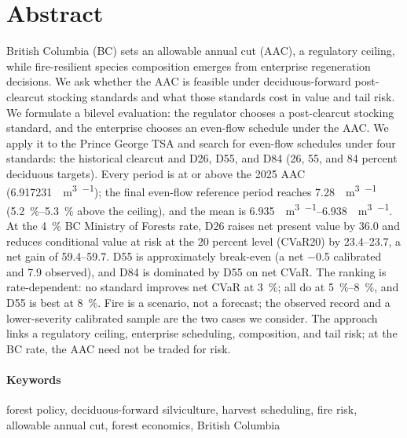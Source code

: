 \section*{Abstract}

British Columbia (BC) sets an allowable annual cut (AAC), a regulatory ceiling, while fire-resilient
species composition emerges from enterprise regeneration decisions. We ask whether the AAC is
feasible under deciduous-forward post-clearcut stocking standards and what those standards cost in
value and tail risk. We formulate a bilevel evaluation: the regulator chooses a post-clearcut stocking standard, and the
enterprise chooses an even-flow schedule under the AAC. We apply it to the Prince George TSA and search for even-flow schedules under four standards: the historical clearcut and D26, D55, and D84 (26, 55,
and 84 percent deciduous targets). Every period is at or above the 2025 AAC
(\SI{6.917231}{\mega\cubic\meter\per\year}); the final even-flow reference period reaches
\SI{7.28}{\mega\cubic\meter\per\year} (\SIrange{5.2}{5.3}{\percent} above the ceiling), and the mean
is \SIrange{6.935}{6.938}{\mega\cubic\meter\per\year}. At the \SI{4}{\percent} BC
Ministry of Forests rate, D26 raises net present value by \SI{36.0}{\millionCAD} and reduces
conditional value at risk at the 20 percent level (CVaR20) by
\SIrange{23.4}{23.7}{\millionCAD}, a net gain of \SIrange{59.4}{59.7}{\millionCAD}. D55 is
approximately break-even (a net \SI{-0.5}{\millionCAD} calibrated and \SI{7.9}{\millionCAD} observed), and D84 is dominated by D55 on net
CVaR. The ranking is rate-dependent: no standard improves net CVaR at \SI{3}{\percent}; all do at
\SIrange{5}{8}{\percent}, and D55 is best at \SI{8}{\percent}. Fire is a scenario, not a forecast;
the observed record and a lower-severity calibrated sample are the two cases we consider. The approach links a regulatory ceiling, enterprise scheduling, composition, and tail risk; at the
BC rate, the AAC need not be traded for risk.

\vspace{1cm}

\paragraph{Keywords} forest policy, deciduous-forward silviculture, harvest scheduling, fire risk,
allowable annual cut, forest economics, British Columbia

\newpage

